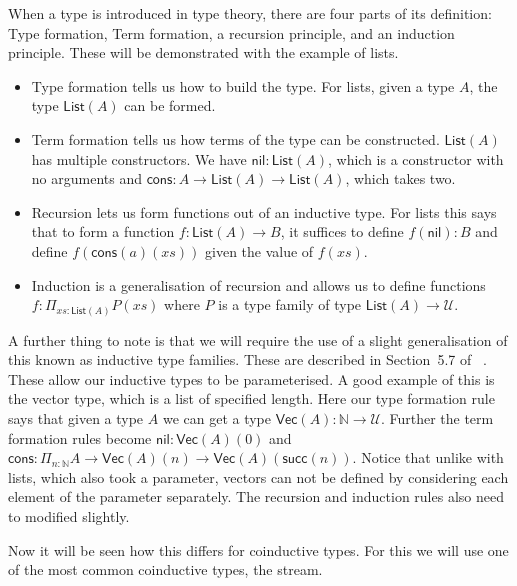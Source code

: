 \documentclass{article}
\theoremstyle{definition}
\theoremstyle{remark}
\begin{document}
When a type is introduced in type theory, there are four parts of its definition: Type formation, Term formation, a recursion principle, and an induction principle. These will be demonstrated with the example of lists.
\begin{itemize}
\item Type formation tells us how to build the type. For lists, given a type \(A\), the type \(\mathsf{List}(A)\) can be formed.
\item Term formation tells us how terms of the type can be constructed. \(\mathsf{List}(A)\) has multiple constructors. We have \(\mathsf{nil} : \mathsf{List}(A)\), which is a constructor with no arguments and \(\mathsf{cons} : A \to \mathsf{List}(A) \to \mathsf{List}(A)\), which takes two.
\item Recursion lets us form functions out of an inductive type. For lists this says that to form a function \(f : \mathsf{List}(A) \to B\), it suffices to define \(f(\mathsf{nil}) : B\) and define \(f(\mathsf{cons}(a)(xs))\) given the value of \(f(xs)\).
\item Induction is a generalisation of recursion and allows us to define functions \(f : \Pi_{xs : \mathsf{List}(A)} P(xs)\) where \(P\) is a type family of type \(\mathsf{List}(A) \to \mathcal{U}\).
\end{itemize}

A further thing to note is that we will require the use of a slight generalisation of this known as inductive type families. These are described in Section~5.7 of ~\cite{hottbook}. These allow our inductive types to be parameterised. A good example of this is the vector type, which is a list of specified length. Here our type formation rule says that given a type \(A\) we can get a type \(\mathsf{Vec}(A) : \mathbb{N} \to \mathcal{U}\). Further the term formation rules become \(\mathsf{nil} : \mathsf{Vec}(A)(0)\) and \(\mathsf{cons} : \Pi_{n : \mathbb{N}} A \to \mathsf{Vec}(A)(n) \to \mathsf{Vec}(A)(\mathsf{succ}(n))\). Notice that unlike with lists, which also took a parameter, vectors can not be defined by considering each element of the parameter separately. The recursion and induction rules also need to modified slightly.

Now it will be seen how this differs for coinductive types. For this we will use one of the most common coinductive types, the stream.
\end{document}
